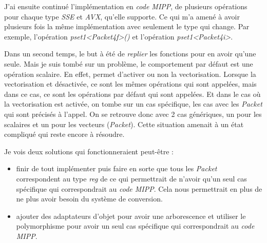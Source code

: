 
J'ai ensuite continué l'implémentation en \emph{code MIPP}, de plusieurs opérations pour
chaque type \emph{SSE} et \emph{AVX}, qu'elle supporte. Ce qui m'a amené à avoir plusieurs
fois la même implémentation \MIPP avec seulement le type qui change. Par exemple,
l'opération \emph{pset1<Packet4f>()} et l'opération \emph{pset1<Packet4i>}.

Dans un second temps, le but à été de \textit{replier} les fonctions pour en avoir qu'une
seule. Mais je suis tombé sur un problème, le comportement par défaut est une opération
scalaire. En effet, \Eigen permet d'activer ou non la vectorisation. Lorsque la
vectorisation et désactivée, ce sont les mêmes opérations qui sont appelées, mais dans ce cas,
ce sont les opérations par défaut qui sont appelées. Et dans le cas où la vectorisation est
activée, on tombe sur un cas spécifique, les cas avec les \emph{Packet} qui sont précisés
à l'appel. On se retrouve donc avec 2 cas génériques, un pour les scalaires
et un pour les vecteurs (\emph{Packet}). Cette situation amenait à un état compliqué qui
reste encore à résoudre.

Je vois deux solutions qui fonctionneraient peut-être :

\begin{itemize}
  \item finir de tout implémenter puis faire en sorte que tous les \emph{Packet}
  correspondent au type \emph{reg} de \MIPP ce qui permettrait de n'avoir qu'un seul cas
  spécifique qui correspondrait au \emph{code MIPP}. Cela nous permettrait en plus de ne
  plus avoir besoin du système de conversion.
  \item ajouter des adaptateurs d'objet pour avoir une arborescence et utiliser le
  polymorphisme pour avoir un seul cas spécifique qui correspondrait au \emph{code MIPP}.
\end{itemize}
